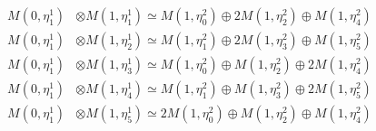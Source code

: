 \begin{align*}
M(0,\eta^{1}_{1}) &\otimes M(1,\eta^{1}_{1}) \simeq M(1,\eta^{2}_{0}) \oplus 2 M(1,\eta^{2}_{2}) \oplus M(1,\eta^{2}_{4}) \\
M(0,\eta^{1}_{1}) &\otimes M(1,\eta^{1}_{2}) \simeq M(1,\eta^{2}_{1}) \oplus 2 M(1,\eta^{2}_{3}) \oplus M(1,\eta^{2}_{5}) \\
M(0,\eta^{1}_{1}) &\otimes M(1,\eta^{1}_{3}) \simeq M(1,\eta^{2}_{0}) \oplus M(1,\eta^{2}_{2}) \oplus 2 M(1,\eta^{2}_{4}) \\
M(0,\eta^{1}_{1}) &\otimes M(1,\eta^{1}_{4}) \simeq M(1,\eta^{2}_{1}) \oplus M(1,\eta^{2}_{3}) \oplus 2 M(1,\eta^{2}_{5}) \\
M(0,\eta^{1}_{1}) &\otimes M(1,\eta^{1}_{5}) \simeq 2 M(1,\eta^{2}_{0}) \oplus M(1,\eta^{2}_{2}) \oplus M(1,\eta^{2}_{4}) \\
\end{align*}

